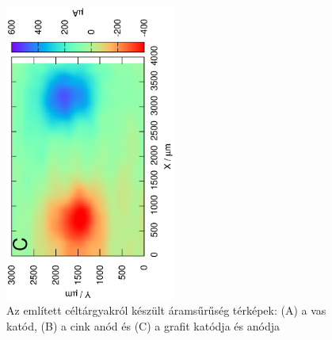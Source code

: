 \begin{figure}
\includegraphics[width=0.5\textwidth, angle=-90]{img/mérések/grafit_h300_field.eps}

\caption{Az említett céltárgyakról készült áramsűrűség térképek:
(A) a vas katód, (B) a cink anód és (C) a grafit katódja és anódja}
\label{fig:áramsűrűség}
\end{figure}
